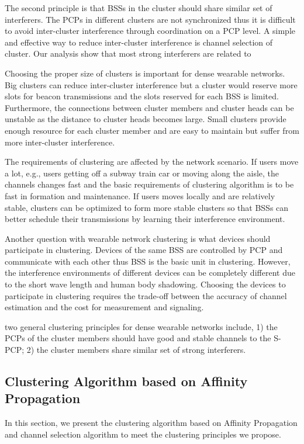 \documentclass[10pt, conference, letterpaper]{IEEEtran}
\begin{document}
The second principle is that BSSs in the cluster should share similar set of interferers. The PCPs in different clusters are not synchronized thus it is difficult to avoid inter-cluster interference through coordination on a PCP level. A simple and effective way to reduce inter-cluster interference is channel selection of cluster. Our analysis show that most strong interferers are related to 



Choosing the proper size of clusters is important for dense wearable networks. Big clusters can reduce inter-cluster interference but a cluster would reserve more slots for beacon transmissions and the slots reserved for each BSS is limited. Furthermore, the connections between cluster members and cluster heads can be unstable as the distance to cluster heads becomes large.
Small clusters provide enough resource for each cluster member and are easy to maintain but suffer from more inter-cluster interference.

The requirements of clustering are affected by the network scenario. If users move a lot, e.g., users getting off a subway train car or moving along the aisle, the channels changes fast and the basic requirements of clustering algorithm is to be fast in formation and maintenance. If users moves locally and are relatively stable, clusters can be optimized to form more stable clusters so that BSSs can better schedule their transmissions by learning their interference environment. 

Another question with wearable network clustering is what devices should participate in clustering. Devices of the same BSS are controlled by PCP and communicate with each other thus BSS is the basic unit in clustering. However, the interference environments of different devices can be completely different due to the short wave length and human body shadowing. Choosing the devices to participate in clustering requires the trade-off between the accuracy of channel estimation and the cost for measurement and signaling. 

two general clustering principles for dense wearable networks include, 1) the PCPs of the cluster members should have good and stable channels to the S-PCP; 2) the cluster members share similar set of strong interferers. 


\subsection{Clustering Algorithm based on Affinity Propagation}\label{section:MAC:ap}
In this section, we present the clustering algorithm based on Affinity Propagation and channel selection algorithm to meet the clustering principles we propose. 
\end{document}
